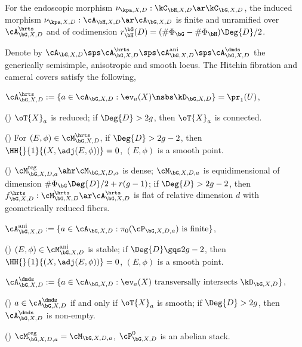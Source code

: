 \documentclass[a4paper, twoside]{article}
\begin{document}
\begin{stp}
	For the endoscopic morphism $\nu_{\kpa,X,D}:\kC_{\bH,X,D}\ar\kC_{\bG,X,D}$, the induced morphism $\nu_{\kpa,X,D}:\cA_{\bH,X,D}\ar\cA_{\bG,X,D}$ is finite and unramified over $\cA_{\bG,X,D}^{\hrts}$ and of codimension $r_{\bH}^{\bG}(D)=(\#\Phi_{\bG}-\#\Phi_{\bH})\Deg{D}/2$.

\end{stp}


\begin{thm}
	Denote by $\cA_{\bG,X,D}\sps\cA_{\bG,X,D}^{\hrts}\sps\cA_{\bG,X,D}^{\text{ani}}\sps\cA_{\bG,X,D}^{\dmds}$ the generically semisimple, anisotropic and smooth locus. The Hitchin fibration and cameral covers satisfy the following,
	\begin{itm}
		\item $\cA_{\bG,X,D}^{\hrts}:=\{a\in\cA_{\bG,X,D}:\ev_{a}(X)\nsbs\kD_{\bG,X,D}\}=\pr_{1}(U)$,
		\begin{enr}[label=(\arabic*)]
			\item (\cite[Lemma~4.5.1, Proposition~4.6.1]{Ngo2010Lemme}) $\oT{X}_{a}$ is reduced; if $\Deg{D}>2g$, then $\oT{X}_{a}$ is connected.
			\item (\cite[Theorem~4.14.1]{Ngo2010Lemme}) For $(E,\phi)\in\cM_{\bG,X,D}^{\hrts}$, if $\Deg{D}>2g-2$, then $\HH{}{1}{(X,\adj(E,\phi))}=0$, $(E,\phi)$ is a smooth point.
			\item (\cite[Proposition~4.16.1, Corollary~4.16.3, Corollary~4.16.4]{Ngo2010Lemme}) $\cM_{\bG,X,D,a}^{\text{reg}}\ahr\cM_{\bG,X,D,a}$ is dense; $\cM_{\bG,X,D,a}$ is equidimensional of dimension $\#\Phi_{\bG}\Deg{D}/2+r(g-1)$; if $\Deg{D}>2g-2$, then $f_{\bG,X,D}^{\hrts}:\cM_{\bG,X,D}^{\hrts}\ar\cA_{\bG,X,D}^{\hrts}$ is flat of relative dimension $d$ with geometrically reduced fibers.
		\end{enr}
		\item $\cA_{\bG,X,D}^{\text{ani}}:=\{a\in\cA_{\bG,X,D}:\pi_{0}(\cP_{\bG,X,D,a}) \text{ is finite}\}$,
		\begin{enr}[label=(\arabic*)]
			\item {}
			\item (\cite[Lemma~6.1.2, Theorem~4.14.1]{Ngo2010Lemme}) $(E,\phi)\in\cM_{\bG,X,D}^{\text{ani}}$ is stable; if $\Deg{D}\gqs2g-2$, then $\HH{}{1}{(X,\adj(E,\phi))}=0$, $(E,\phi)$ is a smooth point.
		\end{enr}
		\item $\cA_{\bG,X,D}^{\dmds}:=\{a\in\cA_{\bG,X,D}:\ev_{a}(X) \text{ transversally intersects } \kD_{\bG,X,D}\}$,
		\begin{enr}[label=(\arabic*)]
			\item (\cite[Proposition~4.7.1, Lemma~4.7.3]{Ngo2010Lemme}) $a\in\cA_{\bG,X,D}^{\dmds}$ if and only if $\oT{X}_{a}$ is smooth; if $\Deg{D}>2g$, then $\cA_{\bG,X,D}^{\dmds}$ is non-empty.
			\item (\cite[Proposition~4.7.7]{Ngo2010Lemme}) $\cM_{\bG,X,D,a}^{\text{reg}}=\cM_{\bG,X,D,a}$, $\cP_{\bG,X,D}^{0}$ is an abelian stack.
		\end{enr}
	\end{itm}
\end{thm}
\end{document}
